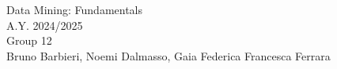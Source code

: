 \documentclass[10pt,openany]{report}
\begin{document}
\pagestyle{empty}         %
\begin{center}  
     {\LARGE { Data Mining: Fundamentals}}\\
     \vspace{2cm}
    {\Large { A.Y. 2024/2025 }}\\
    \vspace{2cm}
    {\Large { Group 12 }}\\
     \vspace{2cm}
     {\large { Bruno Barbieri, Noemi Dalmasso, Gaia Federica Francesca Ferrara }}
\end{center}



  


\clearpage

\tableofcontents
\clearpage

\setcounter{page}{1}    %
\pagestyle{scrplain}    %
\end{document}
